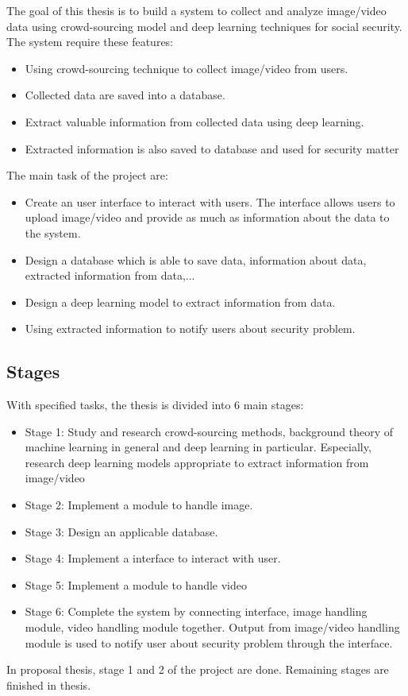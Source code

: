 The goal of this thesis is to build a system to collect and analyze image/video data using crowd-sourcing model and deep learning techniques for social security. The system require these features:
\begin{itemize}
	\item Using crowd-sourcing technique to collect image/video from users.
	\item Collected data are saved into a database.
	\item Extract valuable information from collected data using deep learning.
	\item Extracted information is also saved to database and used for security matter
\end{itemize} 
The main task of the project are:
\begin{itemize}
	\item Create an user interface to interact with users. The interface allows users to upload image/video and provide as much as information about the data to the system.
	\item Design a database which is able to save data, information about data, extracted information from data,...
	\item Design a deep learning model to extract information from data.
	\item Using extracted information to notify users about security problem.
\end{itemize} 

\subsection{Stages}
With specified tasks, the thesis is divided into 6 main stages:
\begin{itemize}
	\item Stage 1: Study and research crowd-sourcing methods, background theory of machine learning in general and deep learning in particular. Especially, research deep learning models appropriate to extract information from image/video
	\item Stage 2: Implement a module to handle image. 
	\item Stage 3: Design an applicable database.
	\item Stage 4: Implement a interface to interact with user.
	\item Stage 5: Implement a module to handle video
	\item Stage 6: Complete the system by connecting interface, image handling module, video handling module together. Output from image/video handling module is used to notify user about security problem through the interface.
\end{itemize} 
In proposal thesis, stage 1 and 2 of the project are done. Remaining stages are finished in thesis.  
